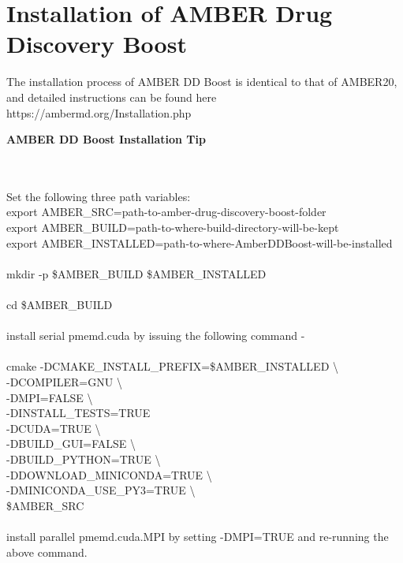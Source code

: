 \documentclass[11pt,letterpaper,titlepage]{article}
\newenvironment{ftabbing}
  {\begin{lrbox}{\ftabbingbox}
   \begin{minipage}{\dimexpr\linewidth-2\fboxsep-2\fboxrule}
   \begin{tabbing}}
  {\end{tabbing}
   \end{minipage}
   \end{lrbox}
   \setlength{\fboxrule}{2pt}
   \setlength{\fboxsep}{2pt}
   \fbox{\usebox{\ftabbingbox}}}
\begin{document}
\vspace{0.1cm}
\section {Installation of AMBER Drug Discovery Boost}
\vspace{0.1cm}

The installation process of AMBER DD Boost is identical to that of 
AMBER20, and detailed instructions can be found here 
https://ambermd.org/Installation.php

\begin{center}
\begin{ftabbing}
	\centerline{\textbf{AMBER DD Boost Installation Tip}} \\
	\\
	Set the following three path variables: \\
	export AMBER\_SRC=path-to-amber-drug-discovery-boost-folder \\
	export AMBER\_BUILD=path-to-where-build-directory-will-be-kept \\
	export AMBER\_INSTALLED=path-to-where-AmberDDBoost-will-be-installed \\
	\\
	mkdir -p \${AMBER\_BUILD} \${AMBER\_INSTALLED} \\
	\\
	cd \$AMBER\_BUILD \\
	\\
	install serial pmemd.cuda by issuing the following command - \\
	\\
	cmake 	-DCMAKE\_INSTALL\_PREFIX=\${AMBER\_INSTALLED} \textbackslash \\
	\hspace{1cm}	-DCOMPILER=GNU \textbackslash \\
	\hspace{1cm}	-DMPI=FALSE \textbackslash \\
	\hspace{1cm}	-DINSTALL\_TESTS=TRUE \\
	\hspace{1cm}	-DCUDA=TRUE \textbackslash \\
	\hspace{1cm}	-DBUILD\_GUI=FALSE \textbackslash \\
	\hspace{1cm}	-DBUILD\_PYTHON=TRUE \textbackslash \\
	\hspace{1cm}	-DDOWNLOAD\_MINICONDA=TRUE \textbackslash \\
	\hspace{1cm}	-DMINICONDA\_USE\_PY3=TRUE \textbackslash \\
	\hspace{1cm}	\${AMBER\_SRC} \\
	
	\\
	install parallel pmemd.cuda.MPI by setting -DMPI=TRUE and
	re-running the above command.
\end{ftabbing}
\end{center}
\end{document}
